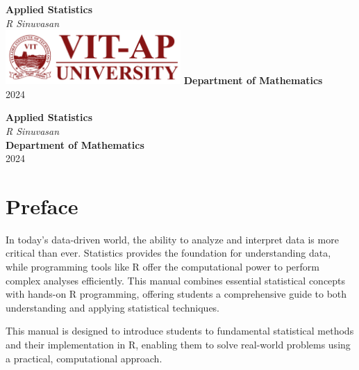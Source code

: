 \documentclass[12pt]{book}
\begin{document}
\begin{titlepage}
    \centering
    \vspace*{1in}
    {\Huge\bfseries\color{chaptercolor} Applied Statistics}\\
    \vspace{0.5in}
    {\Large\textit{R Sinuvasan}}\\
    \vfill
    \includegraphics[width=0.5\textwidth]{VIT-AP LOGO} %
    \vfill
    {\Large\textbf{Department of Mathematics}}\\
    \vspace{0.2in}
    {\Large 2024}
\end{titlepage}

\newpage
\thispagestyle{empty}
\begin{center}
    \vspace*{1in}
    {\Huge\bfseries\color{chaptercolor} Applied Statistics}\\
    \vspace{0.5in}
    {\Large\textit{R Sinuvasan}}\\
    \vfill
    {\Large\textbf{Department of Mathematics}}\\
    \vspace{0.2in}
    {\Large 2024}
\end{center}
\newpage

\chapter*{Preface}

In today’s data-driven world, the ability to analyze and interpret data is more critical than ever. Statistics provides the foundation for understanding data, while programming tools like R offer the computational power to perform complex analyses efficiently. This manual combines essential statistical concepts with hands-on R programming, offering students a comprehensive guide to both understanding and applying statistical techniques.

This manual is designed to introduce students to fundamental statistical methods and their implementation in R, enabling them to solve real-world problems using a practical, computational approach.
\end{document}
